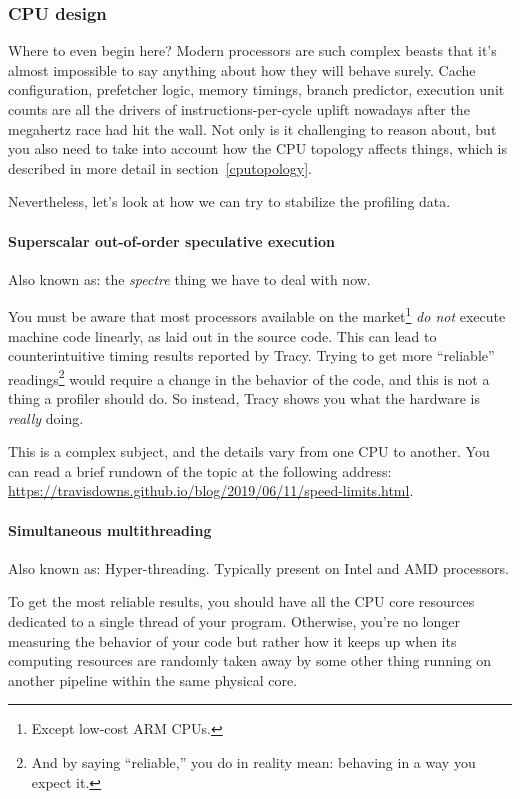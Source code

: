 \documentclass[hidelinks,titlepage,a4paper,twoside]{article}
\begin{document}
\subsubsection{CPU design}
\label{checkenvironmentcpu}

Where to even begin here? Modern processors are such complex beasts that it's almost impossible to say anything about how they will behave surely. Cache configuration, prefetcher logic, memory timings, branch predictor, execution unit counts are all the drivers of instructions-per-cycle uplift nowadays after the megahertz race had hit the wall. Not only is it challenging to reason about, but you also need to take into account how the CPU topology affects things, which is described in more detail in section~\ref{cputopology}.

Nevertheless, let's look at how we can try to stabilize the profiling data.

\paragraph{Superscalar out-of-order speculative execution}

Also known as: the \emph{spectre} thing we have to deal with now.

You must be aware that most processors available on the market\footnote{Except low-cost ARM CPUs.} \emph{do not} execute machine code linearly, as laid out in the source code. This can lead to counterintuitive timing results reported by Tracy. Trying to get more \enquote{reliable} readings\footnote{And by saying \enquote{reliable,} you do in reality mean: behaving in a way you expect it.} would require a change in the behavior of the code, and this is not a thing a profiler should do. So instead, Tracy shows you what the hardware is \emph{really} doing.

This is a complex subject, and the details vary from one CPU to another. You can read a brief rundown of the topic at the following address: \url{https://travisdowns.github.io/blog/2019/06/11/speed-limits.html}.

\paragraph{Simultaneous multithreading}

Also known as: Hyper-threading. Typically present on Intel and AMD processors.

To get the most reliable results, you should have all the CPU core resources dedicated to a single thread of your program. Otherwise, you're no longer measuring the behavior of your code but rather how it keeps up when its computing resources are randomly taken away by some other thing running on another pipeline within the same physical core.
\end{document}
